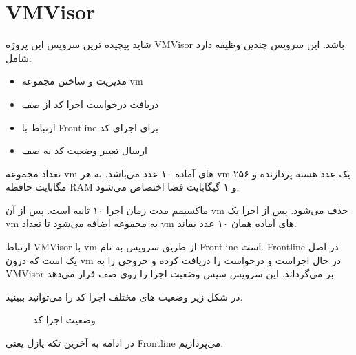 \section{VMVisor}
شاید پیچیده ترین سرویس این پروژه VMVisor باشد.
این سرویس چندین وظیفه دارد شامل:

\begin{itemize}
    \item مدیریت و ساختن مجموعه vm
    \item دریافت درخواست اجرا کد از صف
    \item ارتباط با Frontline برای اجرای کد
    \item ارسال تغییر وضعیت کد به صف
\end{itemize}

تعداد مجموعه vm های آماده ۱۰ عدد می‌باشد. به هر vm یک عدد هسته پردازنده و ۲۵۶ مگابایت حافظه RAM و ۱ گیگابایت فضا اختصاص می‌شود.

ماکسیمم مدت زمان اجرا ۱۰ ثانیه است. پس از آن vm حذف می‌شود.
پس از اجرا یک vm به مجموعه اضافه می‌شود تا تعداد vm های آماده همان ۱۰ عدد بماند.

ارتباط VMVisor با vm از طریق سرویس به نام Frontline است.
Frontline در اصل یک  است که درون vm در حال اجراست و درخواست را دریافت کرده و خروجی را به VMVisor بر می‌گرداند.
این سرویس سپس وضعیت اجرا را روی صف قرار می‌دهد.


در شکل زیر وضعیت های مختلف اجرا کد را می‌توانید ببینید.

\begin{figure}[htbp]
    \centering
    \caption{وضعیت اجرا کد}
    \label{fig:job-state}
\end{figure}

در ادامه به آخرین تکه پازل یعنی Frontline می‌پردازیم.
